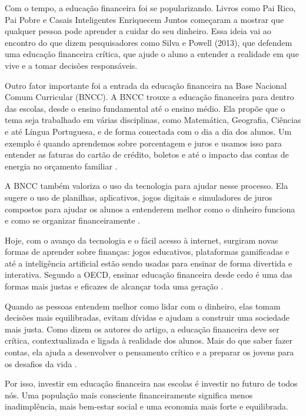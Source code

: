 \documentclass[
	article,			%
	12pt,				%
	oneside,			%
	a4paper,			%
	english,			%
	brazil,				%
	sumario=tradicional
	]{abntex2}
\begin{document}
Com o tempo, a educação financeira foi se popularizando. Livros como Pai Rico, Pai Pobre e Casais Inteligentes Enriquecem Juntos começaram a mostrar que qualquer pessoa pode aprender a cuidar do seu dinheiro. Essa ideia vai ao encontro do que dizem pesquisadores como Silva e Powell (2013), que defendem uma educação financeira crítica, que ajude o aluno a entender a realidade em que vive e a tomar decisões responsáveis.

Outro fator importante foi a entrada da educação financeira na Base Nacional Comum Curricular (BNCC). A BNCC trouxe a educação financeira para dentro das escolas, desde o ensino fundamental até o ensino médio. Ela propõe que o tema seja trabalhado em várias disciplinas, como Matemática, Geografia, Ciências e até Língua Portuguesa, e de forma conectada com o dia a dia dos alunos. Um exemplo é quando aprendemos sobre porcentagem e juros e usamos isso para entender as faturas do cartão de crédito, boletos e até o impacto das contas de energia no orçamento familiar  .

A BNCC também valoriza o uso da tecnologia para ajudar nesse processo. Ela sugere o uso de planilhas, aplicativos, jogos digitais e simuladores de juros compostos para ajudar os alunos a entenderem melhor como o dinheiro funciona e como se organizar financeiramente  .

Hoje, com o avanço da tecnologia e o fácil acesso à internet, surgiram novas formas de aprender sobre finanças: jogos educativos, plataformas gamificadas e até a inteligência artificial estão sendo usadas para ensinar de forma divertida e interativa. Segundo a OECD, ensinar educação financeira desde cedo é uma das formas mais justas e eficazes de alcançar toda uma geração .

Quando as pessoas entendem melhor como lidar com o dinheiro, elas tomam decisões mais equilibradas, evitam dívidas e ajudam a construir uma sociedade mais justa. Como dizem os autores do artigo, a educação financeira deve ser crítica, contextualizada e ligada à realidade dos alunos. Mais do que saber fazer contas, ela ajuda a desenvolver o pensamento crítico e a preparar os jovens para os desafios da vida  .

Por isso, investir em educação financeira nas escolas é investir no futuro de todos nós. Uma população mais consciente financeiramente significa menos inadimplência, mais bem-estar social e uma economia mais forte e equilibrada.
    
\end{document}
